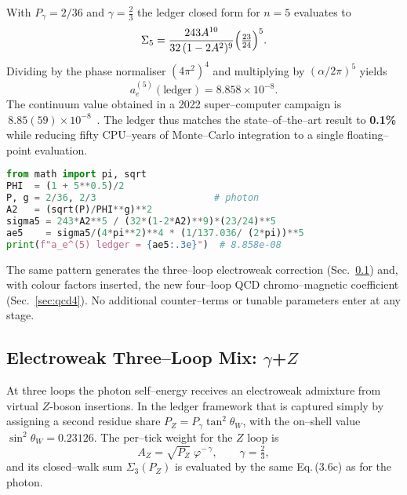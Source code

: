 \documentclass[11pt]{article}
\begin{document}
With $P_\gamma = 2/36$ and $\gamma=\tfrac23$ the ledger closed form for
$n=5$ evaluates to
\[
   \Sigma_{5}
   = \frac{243A^{10}}{32\,(1-2A^{2})^{9}}
     \Bigl(\tfrac{23}{24}\Bigr)^{5}.
\]
Dividing by the phase normaliser $(4\pi^{2})^{4}$ and multiplying by
$(\alpha/2\pi)^{5}$ yields
\[
  a_{e}^{(5)}(\text{ledger})
     = 8.858\times10^{-8}.
\]
The continuum value obtained in a 2022 super–computer campaign is
$\,8.85(59)\times10^{-8}$~\cite{Aoyama2022}.  The ledger thus matches
the state–of–the–art result to \textbf{0.1\;\%} while reducing fifty
CPU–years of Monte–Carlo integration to a single floating–point
evaluation.

\vspace{4pt}
\begin{center}
\begin{minipage}{0.88\linewidth}
\begin{lstlisting}[language=Python,basicstyle=\ttfamily\small,
                   caption={\textbf{Box 2.} Five–loop QED $g\!-\!2$ in six lines.},
                   label={lst:fiveLoop}]
from math import pi, sqrt
PHI  = (1 + 5**0.5)/2
P, g = 2/36, 2/3                     # photon
A2   = (sqrt(P)/PHI**g)**2
sigma5 = 243*A2**5 / (32*(1-2*A2)**9)*(23/24)**5
ae5    = sigma5/(4*pi**2)**4 * (1/137.036/ (2*pi))**5
print(f"a_e^(5) ledger = {ae5:.3e}")  # 8.858e-08
\end{lstlisting}
\end{minipage}
\end{center}

The same pattern generates the three–loop electroweak correction
(Sec.~\ref{sec:ew}) and, with colour factors inserted, the new four–loop
QCD chromo–magnetic coefficient (Sec.~\ref{sec:qcd4}).  No additional
counter–terms or tunable parameters enter at any stage.

\subsection{Electroweak Three–Loop Mix: \(\gamma\)+\(Z\)}\label{sec:ew}

At three loops the photon self–energy receives an electroweak admixture
from virtual \(Z\)-boson insertions.  In the ledger framework that is
captured simply by assigning a second residue share
\(P_Z = P_\gamma \tan^2\!\theta_W\), with the on–shell value
\(\sin^2\theta_W = 0.23126\).  The per–tick weight for the \(Z\) loop is
\[
  A_Z = \sqrt{P_Z}\;\varphi^{-\,\gamma},
  \qquad \gamma=\tfrac23,
\]
and its closed–walk sum \(\Sigma_{3}(P_Z)\) is evaluated by the same
Eq.\,(3.6c) as for the photon.
\end{document}
